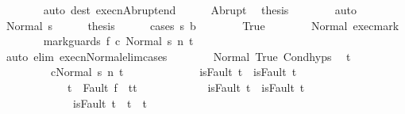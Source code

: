 \begin{isabellebody}
\ \ \ \ \ \ \isamarkupfalse%
\ {\isacharparenleft}auto\ dest{\isacharcolon}\ execn{\isacharunderscore}Abrupt{\isacharunderscore}end{\isacharparenright}\isanewline
\ \ \ \ \isamarkupfalse%
\ Abrupt\ \isamarkupfalse%
\ {\isacharquery}thesis\isanewline
\ \ \ \ \ \ \isamarkupfalse%
\ auto\isanewline
\ \ \isamarkupfalse%
\isanewline
\ \ \ \ \isamarkupfalse%
\ {\isacharparenleft}Normal\ s{\isacharprime}{\isacharparenright}\isanewline
\ \ \ \ \isamarkupfalse%
\ {\isacharquery}thesis\isanewline
\ \ \ \ \isamarkupfalse%
\ {\isacharparenleft}cases\ {\isachardoublequoteopen}s{\isacharprime}{\isasymin}\ b{\isachardoublequoteclose}{\isacharparenright}\isanewline
\ \ \ \ \ \ \isamarkupfalse%
\ True\isanewline
\ \ \ \ \ \ \isamarkupfalse%
\ Normal\ exec{\isacharunderscore}mark\isanewline
\ \ \ \ \ \ \isamarkupfalse%
\ {\isachardoublequoteopen}{\isasymGamma}{\isasymturnstile}{\isasymlangle}mark{\isacharunderscore}guards\ f\ c{}\ {\isacharcomma}Normal\ s{\isacharprime}{\isasymrangle}\ {\isacharequal}n{\isasymRightarrow}\ t{\isachardoublequoteclose}\isanewline
\ \ \ \ \ \ \ \ \isamarkupfalse%
\ {\isacharparenleft}auto\ elim{\isacharcolon}\ execn{\isacharunderscore}Normal{\isacharunderscore}elim{\isacharunderscore}cases{\isacharparenright}\isanewline
\ \ \ \ \ \ \isamarkupfalse%
\ Normal\ True\ Cond{\isachardot}hyps\ \isamarkupfalse%
\ t{\isacharprime}\isanewline
\ \ \ \ \ \ \ \ \ {\isachardoublequoteopen}{\isasymGamma}{\isasymturnstile}{\isasymlangle}c{}{\isacharcomma}Normal\ s{\isacharprime}{\isasymrangle}\ {\isacharequal}n{\isasymRightarrow}\ t{\isacharprime}{\isachardoublequoteclose}\ \isanewline
\ \ \ \ \ \ \ \ \ \ \ \ {\isachardoublequoteopen}isFault\ t\ {\isasymlongrightarrow}\ isFault\ t{\isacharprime}{\isachardoublequoteclose}\ \isanewline
\ \ \ \ \ \ \ \ \ \ \ \ {\isachardoublequoteopen}t{\isacharprime}\ {\isacharequal}\ Fault\ f\ {\isasymlongrightarrow}\ t{\isacharprime}{\isacharequal}t{\isachardoublequoteclose}\isanewline
\ \ \ \ \ \ \ \ \ \ \ \ {\isachardoublequoteopen}isFault\ t{\isacharprime}\ {\isasymlongrightarrow}\ isFault\ t{\isachardoublequoteclose}\isanewline
\ \ \ \ \ \ \ \ \ \ \ \ {\isachardoublequoteopen}{\isasymnot}\ isFault\ t{\isacharprime}\ {\isasymlongrightarrow}\ t{\isacharprime}\ {\isacharequal}\ t{\isachardoublequoteclose}\isanewline
\ \ \ \ \ \ \ \ \isamarkupfalse%

\end{isabellebody}
